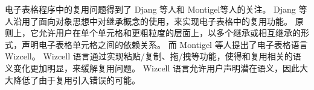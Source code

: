 电子表格程序中的复用问题得到了 Djang 等人\cite{djang1998similarity}和 Montigel等人\cite{montigel2002portability}的关注。
Djang 等人\cite{djang1998similarity}沿用了面向对象思想中对继承概念的使用，来实现电子表格中的复用功能。
原则上，它允许用户在单个单元格和更粗粒度的层面上，以多个继承或相互继承的形式，声明电子表格单元格之间的依赖关系。
而 Montigel 等人\cite{montigel2002portability}提出了电子表格语言 Wizcell。
Wizcell 语言通过实现粘贴/复制、拖/拽等功能，使得和复用相关的语义变化更加明显，来缓解复用问题。
Wizcell 语言允许用户声明潜在语义，因此大大降低了由于复用引入错误的可能。





